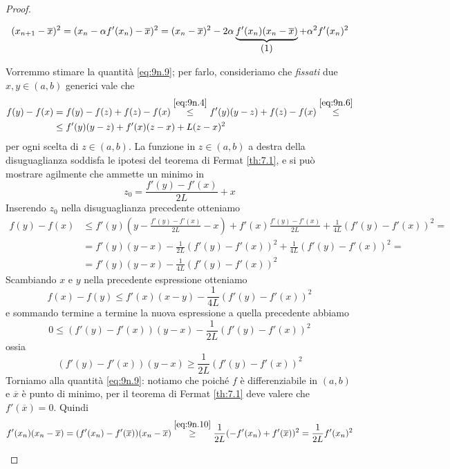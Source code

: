 \begin{proof}
\begin{enumerate}[(i)]
            \[
            (x_{n+1}-\overline{x})^2 = (x_n -\alpha f'(x_n)-\overline{x})^2 = (x_n-\overline{x})^2-2\alpha \underbrace{f'(x_n)(x_n-\overline{x})}_{\stepcounter{equation}\mbox{(\theequation)}}+\alpha^2f'(x_n)^2
            \]   
        \addtocounter{equation}{-1}\label{eq:9n.9}
        Vorremmo stimare la quantità \eqref{eq:9n.9}; per farlo, consideriamo che \emph{fissati} due $x,y\in(a,b)$ generici vale che
        \[
        \begin{split}
            f(y)-f(x) & = f(y)-f(z) + f(z)-f(x) \overset{\eqref{eq:9n.4}}{\le } f'(y)(y-z)+f(z)-f(x) \overset{\eqref{eq:9n.6}}{\le } \\
            & \le f'(y)(y-z)+f'(x)(z-x)+L(z-x)^2
        \end{split}
        \]
        per ogni scelta di $z\in(a,b)$. La funzione in $z\in(a,b)$ a destra della disuguaglianza soddisfa le ipotesi del teorema di Fermat \ref{th:7.1}, e si può mostrare agilmente che ammette un minimo in 
        \[
        z_0 = \frac{f'(y)-f'(x)}{2L}+x
        \]
        Inserendo $z_0$ nella disuguaglianza precedente otteniamo
        \[
        \begin{split}
            f(y)-f(x) & \le f'(y)\left(y - \frac{f'(y)-f'(x)}{2L} -x\right) +f'(x)\frac{f'(y)-f'(x)}{2L}+ \frac{1}{4L}(f'(y)-f'(x))^2 = \\
            & = f'(y)(y-x)- \frac{1}{2L}(f'(y)-f'(x))^2+ \frac{1}{4L}(f'(y)-f'(x))^2 = \\
            & = f'(y)(y-x)- \frac{1}{4L}(f'(y)-f'(x))^2
        \end{split}
        \]
        Scambiando $x$ e $y$ nella precedente espressione otteniamo
        \[
        f(x)-f(y)\le f'(x)(x-y)- \frac{1}{4L}(f'(y)-f'(x))^2
        \]
        e sommando termine a termine la nuova espressione a quella precedente abbiamo
        \[
        0\le (f'(y)-f'(x))(y-x)-\frac{1}{2L}(f'(y)-f'(x))^2
        \]
        ossia
        \begin{equation}
            \label{eq:9n.10}
            (f'(y)-f'(x))(y-x)\ge \frac{1}{2L}(f'(y)-f'(x))^2
        \end{equation}
        Torniamo alla quantità \eqref{eq:9n.9}: notiamo che poiché $f$ è differenziabile in $(a,b)$ e $\overline{x}$ è punto di minimo, per il teorema di Fermat \ref{th:7.1} deve valere che $f'(\overline{x})=0$. Quindi
        \[
        f'(x_n)(x_n-\overline{x}) = (f'(x_n)-f'(\overline{x}))(x_n-\overline{x}) \overset{\eqref{eq:9n.10}}{\ge} \frac{1}{2L}(-f'(x_n)+f'(\overline{x}))^2 = \frac{1}{2L}f'(x_n)^2
\]
\end{enumerate}
\end{proof}

